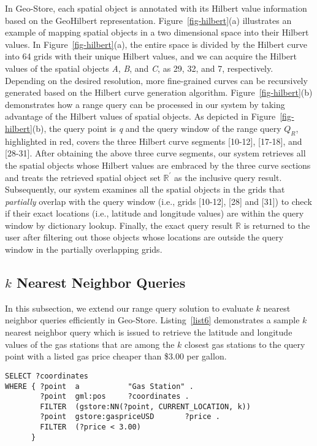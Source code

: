 In Geo-Store, each spatial object is annotated with its Hilbert
value information based on the GeoHilbert representation.
Figure~\ref{fig-hilbert}(a) illustrates an example of mapping
spatial objects in a two dimensional space into their Hilbert
values. In Figure~\ref{fig-hilbert}(a), the entire space is
divided by the Hilbert curve into 64 grids with their unique
Hilbert values, and we can acquire the Hilbert values of the
spatial objects \emph{A}, \emph{B}, and \emph{C}, as 29, 32, and
7, respectively. Depending on the desired resolution, more
fine-grained curves can be recursively generated based on the
Hilbert curve generation algorithm. Figure~\ref{fig-hilbert}(b)
demonstrates how a range query can be processed in our system by
taking advantage of the Hilbert values of spatial objects. As
depicted in Figure~\ref{fig-hilbert}(b), the query point is
\emph{q} and the query window of the range query $Q_R$,
highlighted in red, covers the three Hilbert curve segments
[10-12], [17-18], and [28-31]. After obtaining the above three
curve segments, our system retrieves all the spatial objects whose
Hilbert values are embraced by the three curve sections and treats
the retrieved spatial object set $\mathbb{R}^{\prime}$ as the
inclusive query result. Subsequently, our system examines all the
spatial objects in the grids that \emph{partially} overlap with
the query window (i.e., grids [10-12], [28] and [31]) to check if
their exact locations (i.e., latitude and longitude values) are
within the query window by dictionary lookup. Finally, the exact
query result $\mathbb{R}$ is returned to the user after filtering
out those objects whose locations are outside the query window in
the partially overlapping grids.


\subsection{$k$ Nearest Neighbor Queries}

In this subsection, we extend our range query solution to evaluate
$k$ nearest neighbor queries efficiently in Geo-Store.
Listing~\ref{list6} demonstrates a sample $k$ nearest neighbor
query which is issued to retrieve the latitude and longitude
values of the gas stations that are among the $k$ closest gas
stations to the query point with a listed gas price cheaper than
\$3.00 per gallon.


\lstset{showstringspaces=false} 

\begin{lstlisting}[caption={The sample $k$ nearest neighbor query in Geo-Store (use case 2).},
                   label={list6},
				   frame=single]
SELECT ?coordinates
WHERE { ?point  a           "Gas Station" .
        ?point  gml:pos     ?coordinates .
        FILTER  (gstore:NN(?point, CURRENT_LOCATION, k))
        ?point  gstore:gaspriceUSD       ?price .
        FILTER  (?price < 3.00)
      }
\end{lstlisting}

